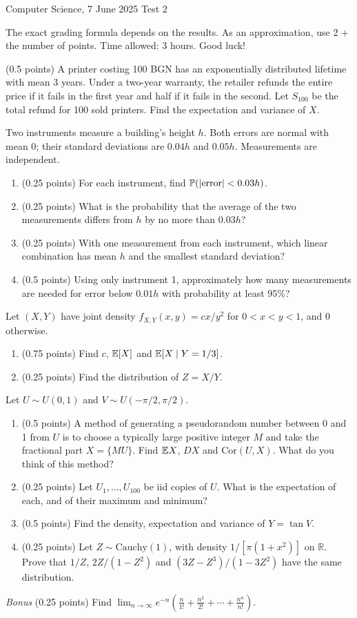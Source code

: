\documentclass[a4paper]{report}
\begin{document}
\noindent Computer Science, 7 June 2025 \hfill Test 2
\hrulefill
\begin{it}The exact grading formula depends on the results. As an approximation, use 2 + the number of points. Time allowed: 3 hours. Good luck!\end{it}
\begin{problem} (0.5 points)
A printer costing 100 BGN has an exponentially distributed lifetime with mean 3 years. Under a two-year warranty, the retailer refunds the entire price if it fails in the first year and half if it fails in the second. Let $S_{100}$ be the total refund for 100 sold printers. Find the expectation and variance of $X$.
\end{problem}
\begin{problem}
Two instruments measure a building's height $h$. Both errors are normal with mean 0; their standard deviations are $0.04h$ and $0.05h$. Measurements are independent.
\begin{enumerate}
\item (0.25 points) For each instrument, find $\P(|\mathrm{error}|<0.03h)$.
\item (0.25 points) What is the probability that the average of the two measurements differs from $h$ by no more than $0.03h$?
\item (0.25 points) With one measurement from each instrument, which linear combination has mean $h$ and the smallest standard deviation?
\item (0.5 points) Using only instrument 1, approximately how many measurements are needed for error below $0.01h$ with probability at least 95\%?
\end{enumerate}
\end{problem}
\begin{problem}
Let $(X,Y)$ have joint density $f_{X,Y}(x,y)=cx/y^2$ for $0<x<y<1$, and 0 otherwise.
\begin{enumerate}
\item (0.75 points) Find $c$, $\E[X]$ and $\E[X\mid Y=1/3]$.
\item (0.25 points) Find the distribution of $Z=X/Y$.
\end{enumerate}
\end{problem}
\begin{problem}
Let $U\sim U(0,1)$ and $V\sim U(-\pi/2,\pi/2)$.
\begin{enumerate}
\item (0.5 points) A method of generating a pseudorandom number between 0 and 1 from $U$ is to choose a typically large positive integer $M$ and take the fractional part $X=\{MU\}$. Find $\E X$, $DX$ and $\mathrm{Cor}(U,X)$. What do you think of this method?
\item (0.25 points) Let $U_1,\ldots,U_{100}$ be iid copies of $U$. What is the expectation of each, and of their maximum and minimum?
\item (0.5 points) Find the density, expectation and variance of $Y=\tan V$.
\item (0.25 points) Let $Z\sim\mathrm{Cauchy}(1)$, with density $1/[\pi(1+x^2)]$ on $\mathbb R$. Prove that $1/Z$, $2Z/(1-Z^2)$ and $(3Z-Z^3)/(1-3Z^2)$ have the same distribution.
\end{enumerate}
\end{problem}
\begin{problem} \emph{Bonus} (0.25 points)
Find $\displaystyle\lim_{n\to\infty}e^{-n}\left(\frac n{1!}+\frac{n^2}{2!}+\cdots+\frac{n^n}{n!}\right)$.
\end{problem}
\end{document}
